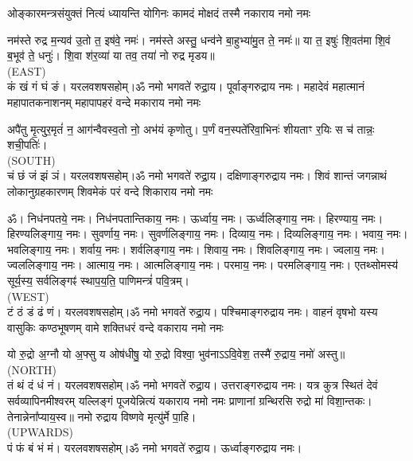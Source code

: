 



\twolineshloka
{ओङ्कारमन्त्रसंयुक्तं नित्यं ध्यायन्ति योगिनः}
{कामदं मोक्षदं तस्मै नकाराय नमो नमः}

नम॑स्ते रुद्र म॒न्यव॑ उ॒तो त॒ इष॑वे॒ नमः॑। नम॑स्ते अस्तु॒ धन्व॑ने बा॒हुभ्या॑मु॒त ते॒ नमः॑॥ या त॒ इषुः॑ शि॒वत॑मा शि॒वं ब॒भूव॑ ते॒ धनुः॑। शि॒वा श॑र॒व्या॑ या तव॒ तया॑ नो रुद्र मृडय॥\\
{\scriptsize (EAST)}\\
कं खं गं घं ङं। यरलवशषसहोम्।ॐ नमो भगवते॑ रुद्रा॒य। पूर्वाङ्गरुद्राय नमः। 
\medskip
\twolineshloka
{महादेवं महात्मानं महापातकनाशनम्}
{महापापहरं वन्दे मकाराय नमो नमः}

अपै॑तु मृ॒त्युर॒मृतं॑ न॒ आग॑न्वैवस्व॒तो नो॒ अभ॑यं कृणोतु।
प॒र्णं वन॒स्पते॑रिवा॒भिनः॑ शीयताꣳ र॒यिः स च॑ तान्नः॒ शची॒पतिः॑।\\
{\scriptsize (SOUTH)}\\
चं छं जं झं ञं। यरलवशषसहोम्।ॐ नमो भगवते॑ रुद्रा॒य। दक्षिणाङ्गरुद्राय नमः।
\medskip
\twolineshloka
{शिवं शान्तं जगन्नाथं लोकानुग्रहकारणम्}
{शिवमेकं परं वन्दे शिकाराय नमो नमः}

ॐ। निध॑नपतये॒ नमः। निध॑नपतान्तिकाय॒ नमः। ऊर्ध्वाय॒ नमः। ऊर्ध्वलिङ्गाय॒ नमः। हिरण्याय॒ नमः। हिरण्यलिङ्गाय॒ नमः। सुवर्णाय॒ नमः। सुवर्णलिङ्गाय॒ नमः। दिव्याय॒ नमः। दिव्यलिङ्गाय॒ नमः। भवाय॒ नमः। भवलिङ्गाय॒ नमः। शर्वाय॒ नमः। शर्वलिङ्गाय॒ नमः। शिवाय॒ नमः। शिवलिङ्गाय॒ नमः। ज्वलाय॒ नमः। ज्वललिङ्गाय॒ नमः। आत्माय॒ नमः। आत्मलिङ्गाय॒ नमः। परमाय॒ नमः। परमलिङ्गाय॒ नमः। एतथ्सोमस्य॑ सूर्य॒स्य॒ सर्वलिङ्गꣴ॑ स्थाप॒य॒ति॒ पाणिमन्त्रं॑ पवि॒त्रम्।\\
{\scriptsize (WEST)}\\
टं ठं डं ढं णं। यरलवशषसहोम्।ॐ नमो भगवते॑ रुद्रा॒य। पश्चिमाङ्गरुद्राय नमः।
\medskip
\twolineshloka
{वाहनं वृषभो यस्य वासुकिः कण्ठभूषणम्}
{वामे शक्तिधरं वन्दे वकाराय नमो नमः}

यो रु॒द्रो अ॒ग्नौ यो अ॒फ्सु य ओष॑धीषु॒ यो रु॒द्रो विश्वा॒ भुव॑नाऽऽवि॒वेश॒ तस्मै॑ रु॒द्राय॒ नमो॑ अस्तु॥ \\
{\scriptsize (NORTH)}\\
तं थं दं धं नं। यरलवशषसहोम्।ॐ नमो भगवते॑ रुद्रा॒य। उत्तराङ्गरुद्राय नमः।
\medskip
\twolineshloka
{यत्र कुत्र स्थितं देवं सर्वव्यापिनमीश्वरम्}
{यल्लिङ्गं पूजयेन्नित्यं यकाराय नमो नमः}
प्राणानां ग्रन्थिरसि रुद्रो मा॑ विशा॒न्तकः। तेनान्नेना᳚प्याय॒स्व॥ नमो रुद्राय विष्णवे मृत्यु॑र्मे पा॒हि।\\
{\scriptsize (UPWARDS)}\\
पं फं बं भं मं। यरलवशषसहोम्।ॐ नमो भगवते॑ रुद्रा॒य। ऊर्ध्वाङ्गरुद्राय नमः।

